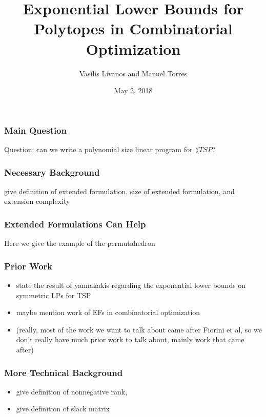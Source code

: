 \documentclass{beamer}
\author[Livanos, Torres]{Vasilis Livanos and Manuel Torres}
\title[Exp. Lower Bounds for Polytopes]{Exponential Lower Bounds for Polytopes in Combinatorial Optimization}
\institute[UIUC]{University of Illinois at Urbana-Champaign}
\date{May 2, 2018}
\newcommand{\xc}{\operatorname{xc}}
\begin{document}
\begin{frame}
\titlepage
\end{frame}


\begin{frame}
\frametitle{Main Question}
Question: can we write a polynomial size linear program for $\lang{TSP}$?
\end{frame}


\begin{frame}
\frametitle{Necessary Background}

give definition of extended formulation, size of extended formulation, and extension complexity
%

\end{frame}


\begin{frame}
\frametitle{Extended Formulations Can Help}
Here we give the example of the permutahedron
\end{frame}


\begin{frame}
\frametitle{Prior Work}
\begin{itemize}
\item state the result of yannakakis regarding the exponential lower bounds on symmetric LPs for TSP
\item maybe mention work of EFs in combinatorial optimization
\item (really, most of the work we want to talk about came after Fiorini et al, so we don't really have much prior work to talk about, mainly work that came after)
\end{itemize}
\end{frame}


\begin{frame}
\frametitle{More Technical Background}
\begin{itemize}
\item give definition of nonnegative rank,
\item give definition of slack matrix
\end{itemize}
\end{frame}
\end{document}

